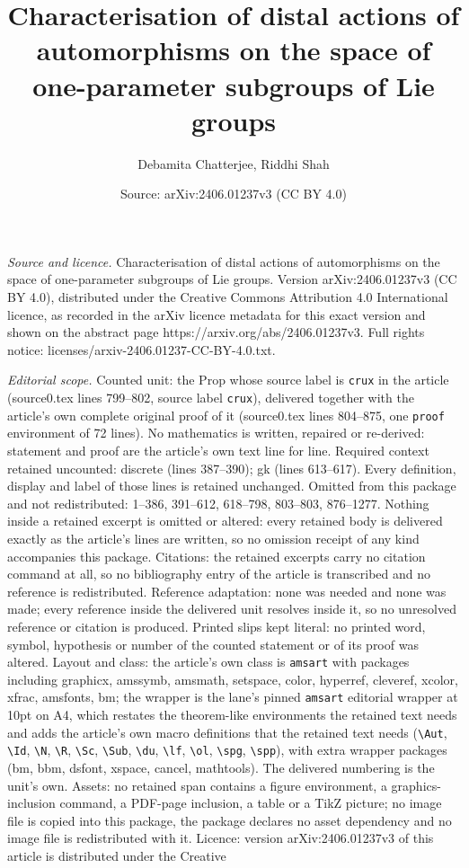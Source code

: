\documentclass[10pt,a4paper]{amsart}
\title[Characterisation of distal actions of automorphisms on the s]{Characterisation of distal actions of automorphisms on the space of one-parameter subgroups of Lie groups}
\author{Debamita Chatterjee, Riddhi Shah}
\date{Source: arXiv:2406.01237v3 (CC BY 4.0)}
\begin{document}
\maketitle

\noindent\emph{Source and licence.} Characterisation of distal actions of automorphisms on the space of one-parameter subgroups of Lie groups. Version arXiv:2406.01237v3 (CC BY 4.0), distributed under the Creative Commons Attribution 4.0 International licence, as recorded in the arXiv licence metadata for this exact version and shown on the abstract page https://arxiv.org/abs/2406.01237v3. Full rights notice: licenses/arxiv-2406.01237-CC-BY-4.0.txt.\par\smallskip

\noindent\textit{Editorial scope.} Counted unit: the Prop whose source label is \texttt{crux} in the article (source0.tex lines 799--802, source label \texttt{crux}), delivered together with the article's own complete original proof of it (source0.tex lines 804--875, one \texttt{proof} environment of 72 lines). No mathematics is written, repaired or re-derived: statement and proof are the article's own text line for line. Required context retained uncounted: discrete (lines 387--390); gk (lines 613--617). Every definition, display and label of those lines is retained unchanged. Omitted from this package and not redistributed: 1--386, 391--612, 618--798, 803--803, 876--1277. Nothing inside a retained excerpt is omitted or altered: every retained body is delivered exactly as the article's lines are written, so no omission receipt of any kind accompanies this package. Citations: the retained excerpts carry no citation command at all, so no bibliography entry of the article is transcribed and no reference is redistributed. Reference adaptation: none was needed and none was made; every reference inside the delivered unit resolves inside it, so no unresolved reference or citation is produced. Printed slips kept literal: no printed word, symbol, hypothesis or number of the counted statement or of its proof was altered. Layout and class: the article's own class is \texttt{amsart} with packages including graphicx, amssymb, amsmath, setspace, color, hyperref, cleveref, xcolor, xfrac, amsfonts, bm; the wrapper is the lane's pinned \texttt{amsart} editorial wrapper at 10pt on A4, which restates the theorem-like environments the retained text needs and adds the article's own macro definitions that the retained text needs (\texttt{\textbackslash Aut}, \texttt{\textbackslash Id}, \texttt{\textbackslash N}, \texttt{\textbackslash R}, \texttt{\textbackslash Sc}, \texttt{\textbackslash Sub}, \texttt{\textbackslash du}, \texttt{\textbackslash lf}, \texttt{\textbackslash ol}, \texttt{\textbackslash spg}, \texttt{\textbackslash spp}), with extra wrapper packages (bm, bbm, dsfont, xspace, cancel, mathtools). The delivered numbering is the unit's own. Assets: no retained span contains a figure environment, a graphics-inclusion command, a PDF-page inclusion, a table or a TikZ picture; no image file is copied into this package, the package declares no asset dependency and no image file is redistributed with it. Licence: version arXiv:2406.01237v3 of this article is distributed under the Creative 
\end{document}
